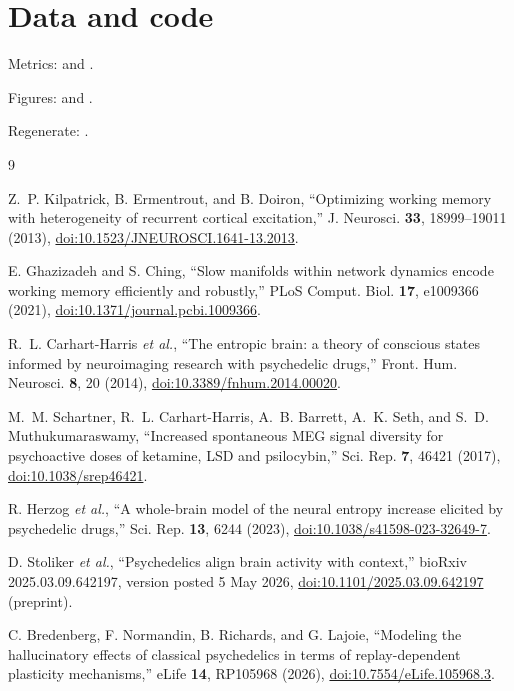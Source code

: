\documentclass[aps,preprint,amsmath,amssymb,nofootinbib,floatfix]{revtex4-2}
\begin{document}
\section*{Data and code}

Metrics:  and .

Figures:  and .

Regenerate: .

\begin{thebibliography}{9}

Z.~P. Kilpatrick, B. Ermentrout, and B. Doiron,
``Optimizing working memory with heterogeneity of recurrent cortical excitation,''
J. Neurosci. \textbf{33}, 18999--19011 (2013),
\href{https://doi.org/10.1523/JNEUROSCI.1641-13.2013}{doi:10.1523/JNEUROSCI.1641-13.2013}.

E. Ghazizadeh and S. Ching,
``Slow manifolds within network dynamics encode working memory efficiently and robustly,''
PLoS Comput. Biol. \textbf{17}, e1009366 (2021),
\href{https://doi.org/10.1371/journal.pcbi.1009366}{doi:10.1371/journal.pcbi.1009366}.

R.~L. Carhart-Harris \emph{et al.},
``The entropic brain: a theory of conscious states informed by neuroimaging research with psychedelic drugs,''
Front. Hum. Neurosci. \textbf{8}, 20 (2014),
\href{https://doi.org/10.3389/fnhum.2014.00020}{doi:10.3389/fnhum.2014.00020}.

M.~M. Schartner, R.~L. Carhart-Harris, A.~B. Barrett, A.~K. Seth, and S.~D. Muthukumaraswamy,
``Increased spontaneous MEG signal diversity for psychoactive doses of ketamine, LSD and psilocybin,''
Sci. Rep. \textbf{7}, 46421 (2017),
\href{https://doi.org/10.1038/srep46421}{doi:10.1038/srep46421}.

R. Herzog \emph{et al.},
``A whole-brain model of the neural entropy increase elicited by psychedelic drugs,''
Sci. Rep. \textbf{13}, 6244 (2023),
\href{https://doi.org/10.1038/s41598-023-32649-7}{doi:10.1038/s41598-023-32649-7}.

D. Stoliker \emph{et al.},
``Psychedelics align brain activity with context,''
bioRxiv 2025.03.09.642197, version posted 5 May 2026,
\href{https://doi.org/10.1101/2025.03.09.642197}{doi:10.1101/2025.03.09.642197} (preprint).

C. Bredenberg, F. Normandin, B. Richards, and G. Lajoie,
``Modeling the hallucinatory effects of classical psychedelics in terms of replay-dependent plasticity mechanisms,''
eLife \textbf{14}, RP105968 (2026),
\href{https://doi.org/10.7554/eLife.105968.3}{doi:10.7554/eLife.105968.3}.

\end{thebibliography}
\end{document}
